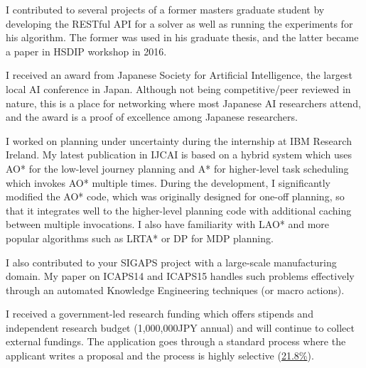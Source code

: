 \documentclass[12pt]{letter}
\begin{document}
I contributed to several projects of a former masters graduate student
by developing the RESTful API for a solver as well as running the
experiments for his algorithm. The former was used in his graduate thesis,
and the latter became a paper in HSDIP workshop in 2016.

I received an award from Japanese Society for Artificial Intelligence,
the largest local AI conference in Japan.
Although not being competitive/peer reviewed in nature,
this is a place for networking where most Japanese AI researchers attend,
and the award is a proof of excellence among Japanese researchers.

I worked on planning under uncertainty during the internship at IBM Research Ireland.
My latest publication in IJCAI is based on a hybrid system which uses
AO* for the low-level journey planning and A* for higher-level task scheduling
which invokes AO* multiple times. 
During the development, I significantly modified the AO* code, which was originally designed for one-off planning,
so that it integrates well to the higher-level planning code with additional caching between multiple invocations.
I also have familiarity with LAO* and more popular algorithms such as LRTA* or DP for MDP planning.

I also contributed to your SIGAPS project with a large-scale
manufacturing domain. My paper on ICAPS14 and ICAPS15 handles such
problems effectively through an automated Knowledge Engineering
techniques (or macro actions).

I received a government-led research funding which offers
stipends and independent research budget (1,000,000JPY annual) and will continue to collect external fundings.
The application goes through a standard process where the applicant writes 
a proposal and the process is highly selective (\href{https://www.jsps.go.jp/j-pd/pd_saiyo.html}{21.8\%}).



\end{document}
